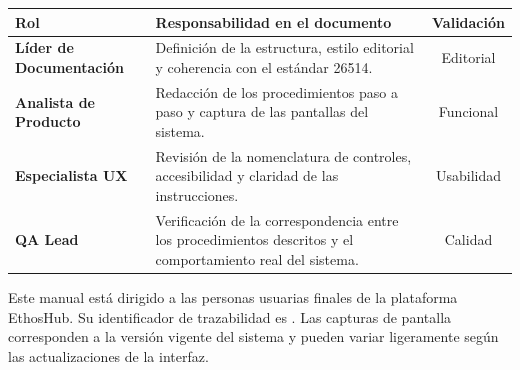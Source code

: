 \vspace{0.2cm}
\noindent
\renewcommand{\arraystretch}{1.4}
\fontsize{9}{10.8}\selectfont\sffamily
\begin{tabularx}{\textwidth}{|>{\bfseries\color{colorPrimario}}l|Y|c|}
\hline
{}
\textbf{Rol} & \textbf{Responsabilidad en el documento} & \textbf{Validación} \\
\hline
Líder de Documentación & Definición de la estructura, estilo editorial y coherencia con el estándar 26514. & Editorial \\
\hline
{}
Analista de Producto & Redacción de los procedimientos paso a paso y captura de las pantallas del sistema. & Funcional \\
\hline
Especialista UX & Revisión de la nomenclatura de controles, accesibilidad y claridad de las instrucciones. & Usabilidad \\
\hline
{}
QA Lead & Verificación de la correspondencia entre los procedimientos descritos y el comportamiento real del sistema. & Calidad \\
\hline
\end{tabularx}

\vspace{0.4cm}
\begin{NotaTecnica}
Este manual está dirigido a las personas usuarias finales de la plataforma EthosHub.
Su identificador de trazabilidad es . Las capturas de
pantalla corresponden a la versión vigente del sistema y pueden variar ligeramente
según las actualizaciones de la interfaz.
\end{NotaTecnica}
